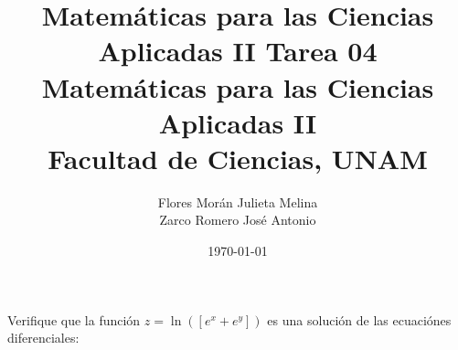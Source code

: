 \documentclass[12pt]{article}
\title{Matemáticas para las Ciencias Aplicadas II}
\title{
        \textbf{Tarea 04} \\
        \vspace{1ex}
        \large Matemáticas para las Ciencias Aplicadas II \\
        Facultad de Ciencias, UNAM}
\date{\today}
\author{Flores Morán Julieta Melina \\ Zarco Romero José Antonio}
\begin{document}
\maketitle

\section{}
Verifique que la función $z = \ln([e^x + e^y])$ es una solución de las ecuaciónes diferenciales:
\end{document}
